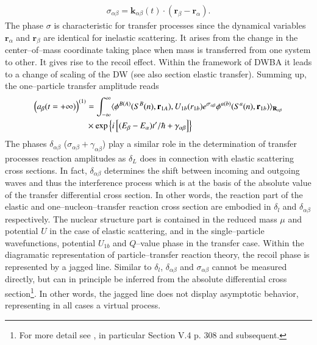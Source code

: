 \begin{subappendices}
\begin{align}\label{eq1.D.36}
\sigma_{\alpha\beta}=\mathbf k_{\alpha\beta}(t)\cdot(\mathbf r_\beta-\mathbf r_\alpha).
\end{align} 
 The phase $\sigma$ is characteristic for transfer processes since the dynamical variables $\mathbf r_\alpha$ and $\mathbf r_\beta$ are identical for inelastic scattering. It arises from the change in the center--of--mass coordinate taking place when mass is transferred from one system to other. It gives rise to the recoil effect. Within the framework of DWBA it leads to a change of scaling of the DW (see also section elastic transfer). Summing up, the one--particle transfer amplitude reads
 \begin{align}\label{eq1.D.37}
\nonumber \left(a_\beta(t=+\infty)\right)^{(1)}&=\int_{-\infty}^{\infty}\langle {\phi^{B(A)}(S^B(n),\mathbf r_{1A}),U_{1b}(r_{1b})e^{\sigma_{\alpha\beta}}\phi^{a(b)}(S^a(n),\mathbf r_{1b})} \rangle_{\mathbf R_{\alpha\beta}}\\
&\times\exp\left\{i\left[(E_\beta-E_\alpha)t'/\hbar+\gamma_{\alpha\beta}\right]\right\}
 \end{align}
 The phases $\delta_{\alpha\beta}$ ($\sigma_{\alpha\beta}+\gamma_{\alpha\beta}$) play a similar role in the determination of transfer processes reaction amplitudes as $\delta_L$ does in connection with elastic scattering cross sections. In fact, $\delta_{\alpha\beta}$ determines the shift between incoming and outgoing waves and thus the interference process which is at the basis of the absolute value of the transfer differential cross section. In other words, the reaction part of the elastic and one--nucleon--transfer reaction cross section are embodied in $\delta_l$ and $\delta_{\alpha\beta}$ respectively. The nuclear structure part is contained in the reduced mass $\mu$ and potential $U$ in the case of elastic scattering, and in the single--particle wavefunctions, potential $U_{1b}$ and $Q$--value phase in the transfer case. Within the diagramatic representation of particle--transfer reaction theory, the recoil phase is represented by a jagged line. Similar to $\delta_l$, $\delta_{\alpha\beta}$  and $\sigma_{\alpha\beta}$ cannot be measured directly, but can in principle  be inferred from the absolute differential cross section\footnote{For more detail see \cite{Broglia:04a}, in particular Section V.4 p. 308 and subsequent.}. In other words, the jagged line does not display asymptotic behavior, representing in all cases a virtual process.  
 
 

\end{subappendices}
